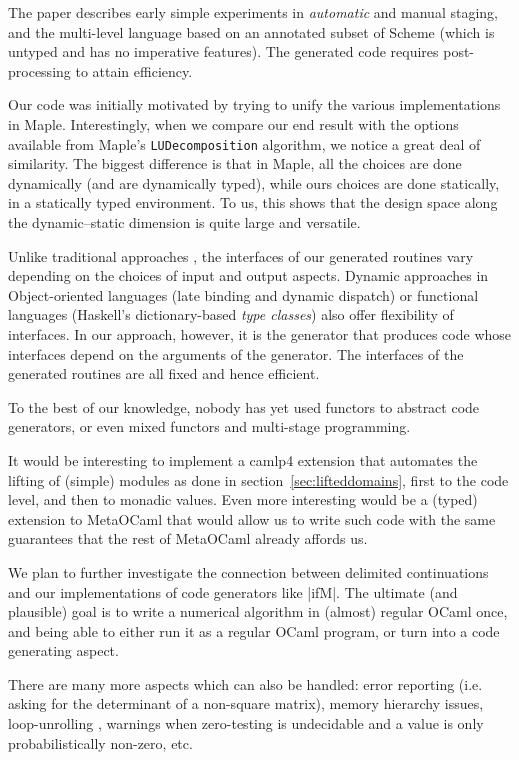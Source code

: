 \documentclass{elsart}
\begin{document}
The paper \cite{GluckJ97} describes early simple experiments in
\emph{automatic} and manual staging, and the multi-level language
based on an annotated subset of Scheme (which is untyped and has no
imperative features). The generated code requires post-processing to
attain efficiency.  

Our code was initially motivated by trying to unify the various
implementations in Maple.  Interestingly, when we compare our end 
result with the options available from Maple's \texttt{LUDecomposition}
algorithm, we notice a great deal of similarity.  The biggest difference
is that in Maple, all the choices are done dynamically (and are dynamically
typed), while ours choices are done statically, in a statically typed
environment.  To us, this shows that the
design space along the dynamic--static dimension is quite large and
versatile.

Unlike traditional approaches
\cite{journals/cacm/parnas72a}, the interfaces of our generated
routines vary depending on the choices of input and output
aspects. Dynamic approaches in Object-oriented languages (late binding
and dynamic dispatch) or functional languages (Haskell's
dictionary-based \emph{type classes}) also offer flexibility of
interfaces. In our approach, however, it is the generator that
produces code whose interfaces depend on the arguments of the
generator. The interfaces of the generated routines are all fixed and
hence efficient.

To the best of our knowledge, nobody has yet used functors to
abstract code generators, or even mixed functors and 
multi-stage programming.

It would be interesting to implement a camlp4 extension that 
automates the lifting of (simple) modules as done in 
section~\ref{sec:lifteddomains},
first to the code level, and then to monadic values.  Even more
interesting would be a (typed) extension to MetaOCaml that would 
allow us to write such code with the same guarantees that the rest of
MetaOCaml already affords us.

We plan to further investigate the connection between delimited
continuations and our implementations of code generators like
|ifM|. The ultimate (and plausible) goal is to write a numerical
algorithm in (almost) regular OCaml once, and being able to either
run it as a regular OCaml program, or turn into a code generating
aspect.

There are many more aspects which can also be handled:
error reporting (i.e. asking for the determinant of a 
non-square matrix), memory hierarchy issues, loop-unrolling
\cite{scp-CohenDGHKP06},
warnings when zero-testing is undecidable and
a value is only probabilistically non-zero, etc.
\end{document}
